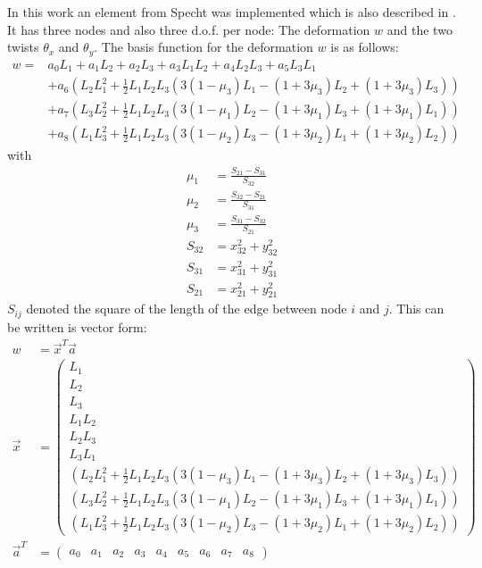   In this work an element from Specht \cite{specht1988modified} was implemented which is also described in \cite{steinke2005finite}. It has three nodes and also three d.o.f. per node: The deformation $w$ and the two twists $\theta_x$ and $\theta_y$. The basis function for the deformation $w$ is as follows:
  \begin{align}
  w = &a_0 L_1 + a_1 L_2 + a_2 L_3 + a_3 L_1L_2 + a_4 L_2L_3 + a_5 L_3L_1 \nonumber\\
    & + a_6\left(L_2L_1^2 + \frac{1}{2}L_1L_2L_3 \left(3(1-\mu_3)L_1 - (1+3\mu_3)L_2 + (1+3\mu_3)L_3\right)\right) \nonumber\\
    & + a_7\left(L_3L_2^2 + \frac{1}{2}L_1L_2L_3 \left(3(1-\mu_1)L_2 - (1+3\mu_1)L_3 + (1+3\mu_1)L_1\right)\right) \nonumber\\
    & + a_8\left(L_1L_3^2 + \frac{1}{2}L_1L_2L_3 \left(3(1-\mu_2)L_3 - (1+3\mu_2)L_1 + (1+3\mu_2)L_2\right)\right)
  \end{align}
  with
  \begin{align}
  \mu_1 &= \frac{S_{21} - S_{31}}{S_{32}} \nonumber\\
  \mu_2 &= \frac{S_{32} - S_{21}}{S_{31}} \nonumber\\
  \mu_3 &= \frac{S_{31} - S_{32}}{S_{21}} \\
  S_{32} &= x_{32}^2 + y_{32}^2 \nonumber\\
  S_{31} &= x_{31}^2 + y_{31}^2 \nonumber\\
  S_{21} &= x_{21}^2 + y_{21}^2
  \end{align}
  $S_{ij}$ denoted the square of the length of the edge between node $i$ and $j$.
  This can be written is vector form:
  \begin{align}\label{eq:platet3w=x*a}
  w &= \vec{x}^T \vec{a} \nonumber\\
  \vec{x} &= \begin{pmatrix}
  L_1 \\ L_2 \\ L_3 \\ L_1L_2 \\ L_2L_3 \\ L_3L_1\\
  \left(L_2L_1^2+\frac{1}{2}L_1L_2L_3\left(3(1-\mu_3)L_1-(1+3\mu_3)L_2+(1+3\mu_3)L_3\right)\right)\\
  \left(L_3L_2^2+\frac{1}{2}L_1L_2L_3\left(3(1-\mu_1)L_2-(1+3\mu_1)L_3+(1+3\mu_1)L_1\right)\right)\\
  \left(L_1L_3^2+\frac{1}{2}L_1L_2L_3\left(3(1-\mu_2)L_3-(1+3\mu_2)L_1+(1+3\mu_2)L_2\right)\right)
  \end{pmatrix} \nonumber\\
  \vec{a}^T &= \begin{pmatrix}
  a_0 & a_1 & a_2 & a_3 & a_4 & a_5 & a_6 & a_7 & a_8
  \end{pmatrix}
  \end{align}
  
